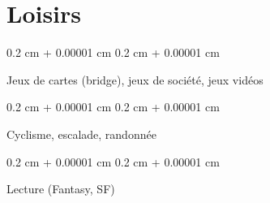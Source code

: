 \documentclass[10pt, letterpaper]{article}
\newenvironment{onecolentry}{
    \begin{adjustwidth}{
        0.2 cm + 0.00001 cm
    }{
        0.2 cm + 0.00001 cm
    }
}{
    \end{adjustwidth}
} %
\begin{document}
    
    \section{Loisirs}



        
        \begin{onecolentry}
            Jeux de cartes (bridge), jeux de société, jeux vidéos
        \end{onecolentry}

        \vspace{0.2 cm}

        \begin{onecolentry}
            Cyclisme, escalade, randonnée
        \end{onecolentry}

        \vspace{0.2 cm}

        \begin{onecolentry}
            Lecture (Fantasy, SF)
        \end{onecolentry}


    
\end{document}
